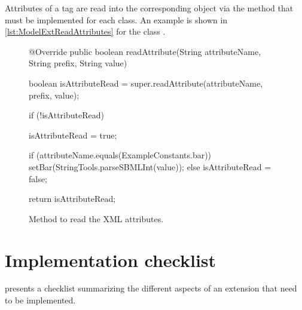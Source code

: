 Attributes of a tag are read into the corresponding object via the
 method that must be implemented for each class.  An
example is shown in \vref{lst:ModelExtReadAttributes} for the class
.

\begin{figure}[htb]
  \begin{example}[numbers=left]
@Override
public boolean readAttribute(String attributeName, String prefix, String value) {

  boolean isAttributeRead = super.readAttribute(attributeName, prefix, value);

  if (!isAttributeRead) {
    isAttributeRead = true;

    if (attributeName.equals(ExampleConstants.bar)) {
      setBar(StringTools.parseSBMLInt(value));
    } else {
      isAttributeRead = false;
    }
  }

  return isAttributeRead;
}\end{example}
  \caption{Method to read the XML attributes.}
  \label{lst:ModelExtReadAttributes}
\end{figure}


\section{Implementation checklist}

 presents a checklist summarizing the different
aspects of an extension that need to be implemented.

\newcommand{\fooname}{\code{\emph{\underline{\color{winered}Foo}}}}
\newcommand{\barname}{\code{\emph{\underline{\color{winered}Bar}}}}

